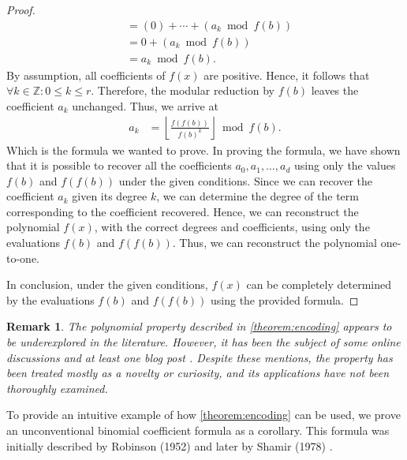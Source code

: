 \documentclass{article}
\theoremstyle{plain}
\newtheorem{remark}{Remark}
\theoremstyle{definition}
\newcommand{\floor}[1]{\left\lfloor #1 \right\rfloor}
\begin{document}
\begin{proof}
\begin{align*}
&= (0) + \cdots + (a_{k} \bmod{f(b)}) \\
&= 0 + (a_{k} \bmod{f(b)}) \\
&= a_{k} \bmod{f(b)} .
\end{align*}
By assumption, all coefficients of $f(x)$ are positive. Hence, it follows that $\forall k \in \mathbb{Z} : 0 \leq k \leq r$. Therefore, the modular reduction by $f(b)$ leaves the coefficient $a_k$ unchanged. Thus, we arrive at
\begin{align*}
a_k &= \floor{\frac{f(f(b))}{f(b)^{k}}} \bmod{f(b)} .
\end{align*}
Which is the formula we wanted to prove. In proving the formula, we have shown that it is possible to recover all the coefficients $a_0, a_1, \ldots, a_d$ using only the values $f(b)$ and $f(f(b))$ under the given conditions. Since we can recover the coefficient $a_k$ given its degree $k$, we can determine the degree of the term corresponding to the coefficient recovered. Hence, we can reconstruct the polynomial $f(x)$, with the correct degrees and coefficients, using only the evaluations $f(b)$ and $f(f(b))$. Thus, we can reconstruct the polynomial one-to-one.

In conclusion, under the given conditions, $f(x)$ can be completely determined by the evaluations $f(b)$ and $f(f(b))$ using the provided formula.
\end{proof}

\begin{remark}
The polynomial property described in \cref{theorem:encoding} appears to be underexplored in the literature. However, it has been the subject of some online discussions \cite{mathoverflow2012application, reddit2023determine} and at least one blog post \cite{jcook2012polynomial}. Despite these mentions, the property has been treated mostly as a novelty or curiosity, and its applications have not been thoroughly examined.
\end{remark}

To provide an intuitive example of how \cref{theorem:encoding} can be used, we prove an unconventional binomial coefficient formula as a corollary. This formula was initially described by Robinson (1952) \cite{robinson1952arithmetic} and later by Shamir (1978) \cite{shamir1978factoring}.
\end{document}
